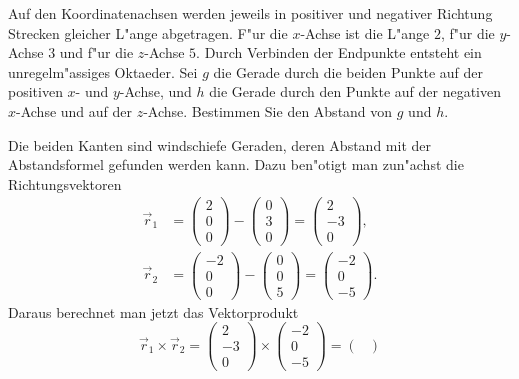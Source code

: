 Auf den Koordinatenachsen werden jeweils in positiver und
negativer Richtung Strecken gleicher L"ange abgetragen. F"ur die
$x$-Achse ist die L"ange $2$, f"ur die $y$-Achse $3$ und f"ur die
$z$-Achse $5$. Durch Verbinden der Endpunkte entsteht ein
unregelm"assiges Oktaeder. Sei $g$ die
Gerade durch die beiden Punkte auf der positiven $x$- und $y$-Achse,
und $h$ die Gerade durch den Punkte auf der negativen $x$-Achse
und auf der $z$-Achse. Bestimmen Sie den Abstand von $g$ und $h$.

\begin{loesung}
Die beiden Kanten sind windschiefe Geraden, deren Abstand mit
der Abstandsformel gefunden werden kann. Dazu ben"otigt man zun"achst die
Richtungsvektoren
\begin{align*}
\vec r_1&=\begin{pmatrix}2\\0\\0\end{pmatrix}-\begin{pmatrix}0\\3\\0\end{pmatrix}
=
\begin{pmatrix}2\\-3\\0\end{pmatrix}
,\\
\vec r_2&=\begin{pmatrix}-2\\0\\0\end{pmatrix}-\begin{pmatrix}0\\0\\5\end{pmatrix}
=
\begin{pmatrix}-2\\0\\-5\end{pmatrix}
.
\end{align*}
Daraus berechnet man jetzt das Vektorprodukt
\[
\vec r_1\times \vec r_2
=
\begin{pmatrix}2\\-3\\0\end{pmatrix}
\times
\begin{pmatrix}-2\\0\\-5\end{pmatrix}
=
\begin{pmatrix}

\end{pmatrix}\]
\end{loesung}
